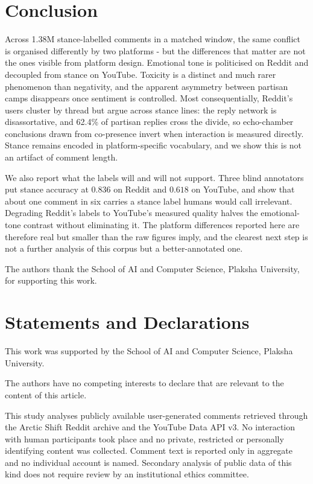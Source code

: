 \documentclass[pdflatex,sn-basic,Numbered,iicol]{sn-jnl}
\begin{document}
\section{Conclusion}
Across 1.38M stance-labelled comments in a matched window, the same conflict is
organised differently by two platforms - but the differences that matter are not the
ones visible from platform design. Emotional tone is politicised on Reddit and
decoupled from stance on YouTube. Toxicity is a distinct and much rarer phenomenon
than negativity, and the apparent asymmetry between partisan camps disappears once
sentiment is controlled. Most consequentially, Reddit's users cluster by thread but
argue across stance lines: the reply network is disassortative, and 62.4\% of
partisan replies cross the divide, so echo-chamber conclusions drawn from co-presence
invert when interaction is measured directly. Stance remains encoded in
platform-specific vocabulary, and we show this is not an artifact of comment length.

We also report what the labels will and will not support. Three blind annotators put
stance accuracy at $0.836$ on Reddit and $0.618$ on YouTube, and show that about one
comment in six carries a stance label humans would call irrelevant. Degrading Reddit's
labels to YouTube's measured quality halves the emotional-tone contrast without
eliminating it. The platform differences reported here are therefore real but smaller
than the raw figures imply, and the clearest next step is not a further analysis of
this corpus but a better-annotated one.

\backmatter

The authors thank the School of AI and Computer Science, Plaksha University, for
supporting this work.

\section*{Statements and Declarations}

This work was supported by the School of AI and Computer Science, Plaksha
University.

The authors have no competing interests to declare that are relevant to the
content of this article.

This study analyses publicly available user-generated comments retrieved through
the Arctic Shift Reddit archive and the YouTube Data API v3. No interaction with
human participants took place and no private, restricted or personally
identifying content was collected. Comment text is reported only in aggregate and
no individual account is named. Secondary analysis of public data of this kind
does not require review by an institutional ethics committee.
\end{document}

